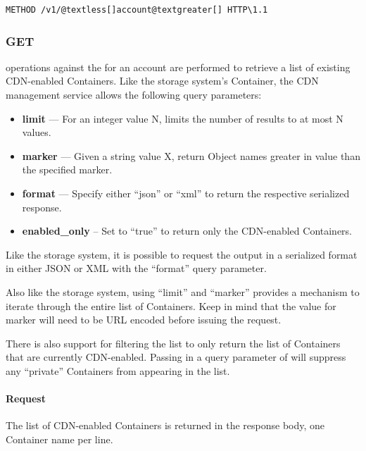 \documentclass[letterpaper,10pt,english]{manual}
\begin{document}
\begin{Verbatim}[commandchars=@\[\]]
METHOD /v1/@textless[]account@textgreater[] HTTP\1.1
\end{Verbatim}


\subsubsection{GET}

 operations against the  for an account
are performed to retrieve a list of existing CDN-enabled Containers.
Like the storage system’s  Container, the CDN management service
allows the following query parameters:
\begin{itemize}
\item {} 
\textbf{limit} — For an integer value N, limits the number of results to
at most N values.

\item {} 
\textbf{marker} — Given a string value X, return Object names greater in
value than the specified marker.

\item {} 
\textbf{format} — Specify either “json” or “xml” to return the respective
serialized response.

\item {} 
\textbf{enabled\_only} – Set to “true” to return only the CDN-enabled
Containers.

\end{itemize}

Like the storage system, it is possible to request the output in a
serialized format in either JSON or XML with the “format” query
parameter.

Also like the storage system, using “limit” and “marker” provides a
mechanism to iterate through the entire list of Containers.  Keep in
mind that the value for marker will need to be URL encoded before
issuing the request.

There is also support for filtering the list to only return the list
of Containers that are currently CDN-enabled.  Passing in a query
parameter of  will suppress any “private”
Containers from appearing in the list.


\paragraph{Request}

The list of CDN-enabled Containers is returned in the response body,
one Container name per line.
\end{document}
